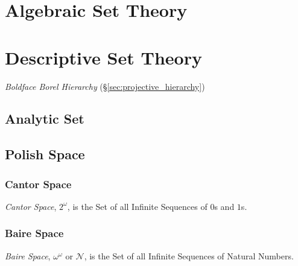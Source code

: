 \section{Algebraic Set Theory}\label{sec:algebraic_set_theory}

\section{Descriptive Set Theory}\label{sec:descriptive_set_theory}

\emph{Boldface Borel Hierarchy} (\S\ref{sec:projective_hierarchy})

\subsection{Analytic Set}\label{sec:analytic_set}

\subsection{Polish Space}\label{sec:polish_space}

\subsubsection{Cantor Space}\label{sec:cantor_space}

\emph{Cantor Space}, $2^{\omega}$, is the Set of all Infinite
Sequences of $0$s and $1$s.



\subsubsection{Baire Space}\label{sec:baire_space}

\emph{Baire Space}, $\omega^{\omega}$ or $\mathcal{N}$, is the Set of
all Infinite Sequences of Natural Numbers.




